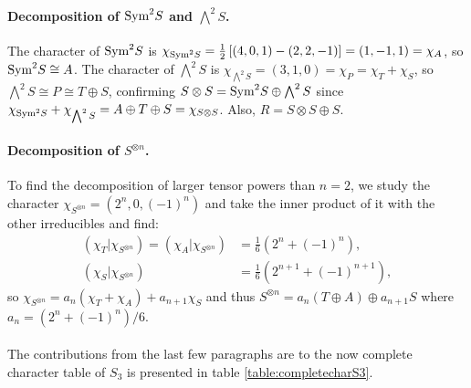 \paragraph{Decomposition of $\text{Sym}^2S$ and $\bigwedge^2S$.} The character of $\text{Sym}^2S$ is $\chi_{\text{Sym}^2S} = \frac{1}{2}\left[ (4,0,1) - (2,2,-1) \right] = (1,-1,1) = \chi_A$, so $\text{Sym}^2S \cong A$. The character of $\bigwedge^2S$ is $\chi_{\bigwedge^2S} = (3,1,0) = \chi_P = \chi_T + \chi_S$, so $\bigwedge^2S \cong P \cong T \oplus S$, confirming $S \otimes S = \text{Sym}^2S \oplus \bigwedge^2S$ since $\chi_{\text{Sym}^2S} + \chi_{\bigwedge^2S} = A \oplus T \oplus S = \chi_{S \otimes S}$. Also, $R = S \otimes S \oplus S$.

\paragraph{Decomposition of $S^{\otimes n}$.}\cite[Exercise 2.7.]{FultonHarris} To find the decomposition of larger tensor powers than $n=2$, we study the character $\chi_{S^{\otimes n}} = (2^n, 0, (-1)^n)$ and take the inner product of it with the other irreducibles and find:
\begin{align*}
	({\chi_T}|{\chi_{S^{\otimes n}}}) = ({\chi_A}|{\chi_{S^{\otimes n}}}) &= \frac{1}{6}\left(2^n + (-1)^n\right), \\
	({\chi_S}|{\chi_{S^{\otimes n}}}) &= \frac{1}{6}\left(2^{n+1} + (-1)^{n+1}\right), 
\end{align*}
so $\chi_{S^{\otimes n}} = a_n (\chi_T + \chi_A) + a_{n+1} \chi_S$ and thus $S^{\otimes n} = a_n (T \oplus A) \oplus a_{n+1} S$ where $a_n = \left(2^n + (-1)^n\right)/6$.

\paragraph{} The contributions from the last few paragraphs are to the now complete character table of $S_3$ is presented in table \ref{table:completecharS3}.

